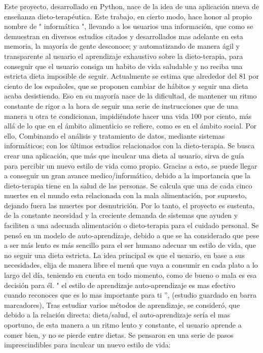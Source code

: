 
Este proyecto, desarrollado en Python, nace de la idea de una aplicación nueva de enseñanza dieto-terapéutica. Este trabajo, en cierto modo, hace honor al propio nombre de " informática ", llevando a los usuarios una información, que como se demuestran en diversos estudios citados y desarrollados mas adelante en esta memoria, la mayoría de gente desconoce; y automatizando de manera ágil y transparente al usuario el aprendizaje exhaustivo sobre la dieto-terapia, para conseguir que el usuario consiga un habito de vida saludable y no reciba una estricta dieta imposible de seguir.
Actualmente se estima que alrededor del 81 por ciento de los españoles, que se proponen cambiar de hábitos y seguir una dieta acaba desistiendo. Eso en su mayoría nace de la dificultad, de mantener un ritmo constante de rigor a la hora de seguir una serie de instrucciones que de una manera u otra te condicionan, impidiéndote hacer una vida 100 por ciento, más allá de lo que en el ámbito alimenticio se refiere, como es en el ámbito social.
Por ello, Combinando el análisis y tratamiento de datos, mediante sistemas informáticos; con los últimos estudios relacionados con la dieto-terapia. Se busca crear una aplicación, que más que inculcar una dieta al usuario, sirva de guía para percibir un nuevo estilo de vida como propio. Gracias a esto, se puede llegar a conseguir un gran avance medico/informático, debido a la importancia que la dieto-terapia tiene en la salud de las personas.
Se calcula que una de cada cinco muertes en el mundo esta relacionada con la mala alimentación, por supuesto, dejando fuera las muertes por desnutrición. Por lo tanto, el proyecto es sustenta, de la constante necesidad y la creciente demanda de sistemas que ayuden y faciliten a una adecuada alimentación o dieto-terapia para el cuidado personal. Se pensó en un modelo de auto-aprendizaje, debido a que se ha considerado que pese a ser más lento es más sencillo para el ser humano adecuar un estilo de vida, que no seguir una dieta estricta. La idea principal es que el usuario, en base a sus necesidades, elija de manera libre el menú que vaya a consumir en cada plato a lo largo del día, teniendo en cuenta en todo momento, como de bueno o mala es esa decisión para él.
" el estilo de aprendizaje auto-aprendizaje es mas efectivo cuando reconoces que es lo mas importante para ti ”,  (estudio guardado en barra marcadores), Tras estudiar varios métodos de aprendizaje, se consideró, que debido a la relación directa: dieta/salud, el auto-aprendizaje sería el mas oportuno, de esta manera a un ritmo lento y constante, el usuario aprende a comer bien, y no se pierde entre dietas.
Se pensaron en una serie de pasos imprescindibles para inculcar un nuevo estilo de vida:

